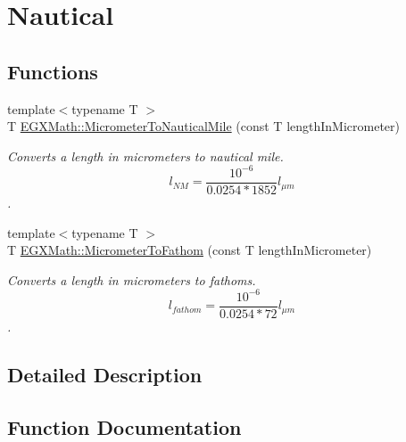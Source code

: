 \hypertarget{group___e_g_x_math-_conversions-_length_conversions-_micrometer-_nautical}{}\section{Nautical}
\label{group___e_g_x_math-_conversions-_length_conversions-_micrometer-_nautical}
\subsection*{Functions}
\begin{DoxyCompactItemize}
\item 
{\footnotesize template$<$typename T $>$ }\\T \mbox{\hyperlink{group___e_g_x_math-_conversions-_length_conversions-_micrometer-_nautical_ga43c5eb76a19baf316e06b38781369157}{E\+G\+X\+Math\+::\+Micrometer\+To\+Nautical\+Mile}} (const T length\+In\+Micrometer)
\begin{DoxyCompactList}\small\item\em Converts a length in micrometers to nautical mile. \[ l_{NM}= \frac{10^{-6}}{0.0254 * 1852} l_{\mu m} \]. \end{DoxyCompactList}\item 
{\footnotesize template$<$typename T $>$ }\\T \mbox{\hyperlink{group___e_g_x_math-_conversions-_length_conversions-_micrometer-_nautical_gad7205d8bf0d8735b12fc0b03c67cf0f7}{E\+G\+X\+Math\+::\+Micrometer\+To\+Fathom}} (const T length\+In\+Micrometer)
\begin{DoxyCompactList}\small\item\em Converts a length in micrometers to fathoms. \[ l_{fathom}= \frac{10^{-6}}{0.0254 * 72} l_{\mu m} \]. \end{DoxyCompactList}\end{DoxyCompactItemize}


\subsection{Detailed Description}


\subsection{Function Documentation}
\mbox{\label{group___e_g_x_math-_conversions-_length_conversions-_micrometer-_nautical_gad7205d8bf0d8735b12fc0b03c67cf0f7}} 
